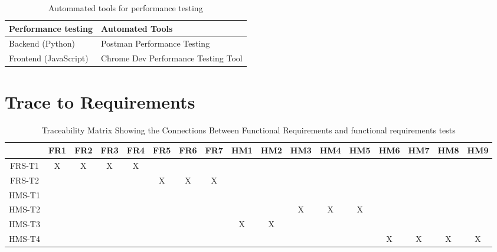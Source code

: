 \documentclass[12pt, titlepage]{article}
\begin{document}
\begin{table}[!h]
    \centering
    \begin{tabular}{p{}|p{}}
    \hline
        \textbf{Performance testing} & \textbf{Automated Tools} \\ \hline
        Backend (Python) & Postman Performance Testing \\ \hline
        Frontend (JavaScript) & Chrome Dev Performance Testing Tool\\ \hline
    \end{tabular}
    \caption{Autommated tools for performance testing}
\end{table}	

\section{Trace to Requirements} 
\begin{landscape}
\begin{table}[h!]
\centering
\begin{tabular}{|c|c|c|c|c|c|c|c|c|c|c|c|c|c|c|c|c|}
\hline
	& FR1 & FR2 & FR3 & FR4 & FR5 & FR6 & FR7 & HM1 & HM2 & HM3 & HM4 & HM5 & HM6 & HM7 & HM8 & HM9 \\
\hline
FRS-T1        & X& X& X& X& & & & & & & & & & & & \\ \hline
FRS-T2        & & & & & X& X& X& & & & & & & & &  \\ \hline
HMS-T1        & & & & & & & & & & & & & & & & \\ \hline
HMS-T2        & & & & & & & & & & X& X& X& & & & \\ \hline
HMS-T3        & & & & & & & & X& X& & & & & & & \\ \hline
HMS-T4        & & & & & & & & & & & & & X& X& X&X \\ \hline

\end{tabular}
\caption{Traceability Matrix Showing the Connections Between Functional Requirements and functional requirements tests}
\label{Table:A_trace}
\end{table}
\end{landscape}
\end{document}
